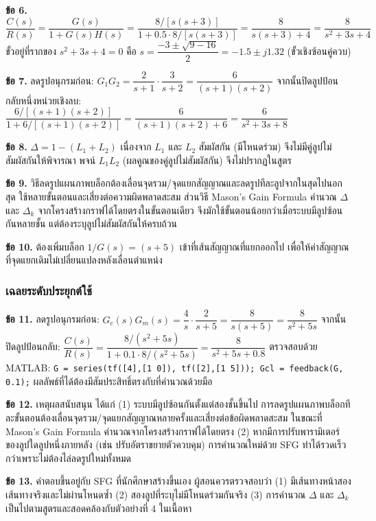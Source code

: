 \textbf{ข้อ 6.} $\dfrac{C(s)}{R(s)}=\dfrac{G(s)}{1+G(s)H(s)}=\dfrac{8/[s(s+3)]}{1+0.5\cdot8/[s(s+3)]}=\dfrac{8}{s(s+3)+4}=\dfrac{8}{s^2+3s+4}$ ขั้วอยู่ที่รากของ $s^2+3s+4=0$ คือ $s=\dfrac{-3\pm\sqrt{9-16}}{2}=-1.5\pm j1.32$ (ขั้วเชิงซ้อนคู่ควบ)

\textbf{ข้อ 7.} ลดรูปอนุกรมก่อน: $G_1G_2=\dfrac{2}{s+1}\cdot\dfrac{3}{s+2}=\dfrac{6}{(s+1)(s+2)}$ จากนั้นปิดลูปป้อนกลับหนึ่งหน่วยเชิงลบ: $\dfrac{6/[(s+1)(s+2)]}{1+6/[(s+1)(s+2)]}=\dfrac{6}{(s+1)(s+2)+6}=\dfrac{6}{s^2+3s+8}$

\textbf{ข้อ 8.} $\Delta = 1-(L_1+L_2)$ เนื่องจาก $L_1$ และ $L_2$ สัมผัสกัน (มีโหนดร่วม) จึงไม่มีคู่ลูปไม่สัมผัสกันให้พิจารณา พจน์ $L_1L_2$ (ผลคูณของคู่ลูปไม่สัมผัสกัน) จึงไม่ปรากฏในสูตร

\textbf{ข้อ 9.} วิธีลดรูปแผนภาพบล็อกต้องเลื่อนจุดรวม/จุดแยกสัญญาณและลดรูปทีละลูปจากในสุดไปนอกสุด ใช้หลายขั้นตอนและเสี่ยงต่อความผิดพลาดสะสม ส่วนวิธี Mason's Gain Formula คำนวณ $\Delta$ และ $\Delta_k$ จากโครงสร้างกราฟได้โดยตรงในขั้นตอนเดียว จึงมักใช้ขั้นตอนน้อยกว่าเมื่อระบบมีลูปซ้อนกันหลายชั้น แต่ต้องระบุลูปไม่สัมผัสกันให้ครบถ้วน

\textbf{ข้อ 10.} ต้องเพิ่มบล็อก $1/G(s) = (s+5)$ เข้าที่เส้นสัญญาณที่แยกออกไป เพื่อให้ค่าสัญญาณที่จุดแยกเดิมไม่เปลี่ยนแปลงหลังเลื่อนตำแหน่ง

\subsubsection{เฉลยระดับประยุกต์ใช้}

\textbf{ข้อ 11.} ลดรูปอนุกรมก่อน: $G_c(s)G_m(s)=\dfrac{4}{s}\cdot\dfrac{2}{s+5}=\dfrac{8}{s(s+5)}=\dfrac{8}{s^2+5s}$ จากนั้นปิดลูปป้อนกลับ: $\dfrac{C(s)}{R(s)}=\dfrac{8/(s^2+5s)}{1+0.1\cdot8/(s^2+5s)}=\dfrac{8}{s^2+5s+0.8}$ ตรวจสอบด้วย MATLAB: \texttt{G = series(tf([4],[1 0]), tf([2],[1 5])); Gcl = feedback(G, 0.1);} ผลลัพธ์ที่ได้ต้องมีสัมประสิทธิ์ตรงกับที่คำนวณด้วยมือ

\textbf{ข้อ 12.} เหตุผลสนับสนุน ได้แก่ (1) ระบบมีลูปซ้อนกันตั้งแต่สองชั้นขึ้นไป การลดรูปแผนภาพบล็อกทีละขั้นตอนต้องเลื่อนจุดรวม/จุดแยกสัญญาณหลายครั้งและเสี่ยงต่อข้อผิดพลาดสะสม ในขณะที่ Mason's Gain Formula คำนวณจากโครงสร้างกราฟได้โดยตรง (2) หากมีการปรับพารามิเตอร์ของลูปใดลูปหนึ่งภายหลัง (เช่น ปรับอัตราขยายตัวควบคุม) การคำนวณใหม่ด้วย SFG ทำได้รวดเร็วกว่าเพราะไม่ต้องไล่ลดรูปใหม่ทั้งหมด

\textbf{ข้อ 13.} คำตอบขึ้นอยู่กับ SFG ที่นักศึกษาสร้างขึ้นเอง ผู้สอนควรตรวจสอบว่า (1) มีเส้นทางหน้าสองเส้นทางจริงและไม่ผ่านโหนดซ้ำ (2) สองลูปที่ระบุไม่มีโหนดร่วมกันจริง (3) การคำนวณ $\Delta$ และ $\Delta_k$ เป็นไปตามสูตรและสอดคล้องกับตัวอย่างที่ 4 ในเนื้อหา


